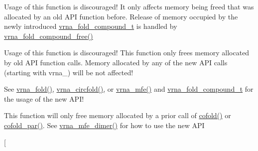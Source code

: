 \begin{DoxyRefList}
\item[\label{deprecated__deprecated000014}%
\Hypertarget{deprecated__deprecated000014}%
Global \mbox{\hyperlink{group__consensus__mfe__fold_ga72095e4554b5d577250ea14c42acc49e}{free\+\_\+alifold\+\_\+arrays}} (void)]Usage of this function is discouraged! It only affects memory being free\textquotesingle{}d that was allocated by an old A\+PI function before. Release of memory occupied by the newly introduced \mbox{\hyperlink{group__fold__compound_ga1b0cef17fd40466cef5968eaeeff6166}{vrna\+\_\+fold\+\_\+compound\+\_\+t}} is handled by \mbox{\hyperlink{group__fold__compound_gadded6039d63f5d6509836e20321534ad}{vrna\+\_\+fold\+\_\+compound\+\_\+free()}} 
\item[\label{deprecated__deprecated000022}%
\Hypertarget{deprecated__deprecated000022}%
Global \mbox{\hyperlink{group__consensus__pf__fold_ga0c0498f35686e26b38ee460d3db1a661}{free\+\_\+alipf\+\_\+arrays}} (void)]Usage of this function is discouraged! This function only free\textquotesingle{}s memory allocated by old A\+PI function calls. Memory allocated by any of the new A\+PI calls (starting with vrna\+\_\+) will be not affected! 
\item[\label{deprecated__deprecated000073}%
\Hypertarget{deprecated__deprecated000073}%
Global \mbox{\hyperlink{group__mfe__fold__single_ga107fdfe5fd641868156bfd849f6866c7}{free\+\_\+arrays}} (void)]See \mbox{\hyperlink{group__mfe__fold__single_ga29a33b2895f4e67b0480271ff289afdc}{vrna\+\_\+fold()}}, \mbox{\hyperlink{group__mfe__fold__single_gaf973483d8acbc8cc9aacfc8a9b7f0074}{vrna\+\_\+circfold()}}, or \mbox{\hyperlink{group__mfe__fold_gabd3b147371ccf25c577f88bbbaf159fd}{vrna\+\_\+mfe()}} and \mbox{\hyperlink{group__fold__compound_ga1b0cef17fd40466cef5968eaeeff6166}{vrna\+\_\+fold\+\_\+compound\+\_\+t}} for the usage of the new A\+P\+I! 
\item[\label{deprecated__deprecated000032}%
\Hypertarget{deprecated__deprecated000032}%
Global \mbox{\hyperlink{group__mfe__cofold_gaafb33d7473eb9af9d1b168ca8761c41a}{free\+\_\+co\+\_\+arrays}} (void)]This function will only free memory allocated by a prior call of \mbox{\hyperlink{group__mfe__cofold_gabc8517f22cfe70595ee81fc837910d52}{cofold()}} or \mbox{\hyperlink{group__mfe__cofold_ga7612cfeeb1b793f1e4179b1eb53df1f3}{cofold\+\_\+par()}}. See \mbox{\hyperlink{group__mfe__cofold_gaab22d10c1190f205f16a77cab9d5d3ee}{vrna\+\_\+mfe\+\_\+dimer()}} for how to use the new A\+PI 
\item[\label{deprecated__deprecated000124}%
%

\end{DoxyRefList}
